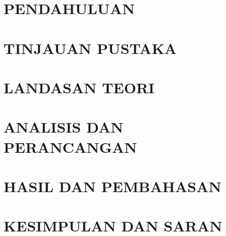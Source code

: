 \documentclass[skripsi]{ugmskripsi}
\begin{document}
\cleardoublepage{}


\cleardoublepage{}


\cleardoublepage{}
{}
\setcounter{page}{1}

\chapter{PENDAHULUAN}
    

\chapter{TINJAUAN PUSTAKA}
    

\chapter{LANDASAN TEORI}
    

\chapter{ANALISIS DAN PERANCANGAN}
    

\chapter{HASIL DAN PEMBAHASAN}
    

\chapter{KESIMPULAN DAN SARAN}
    
\end{document}
